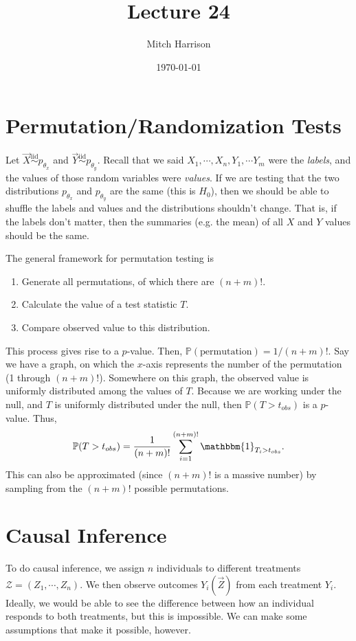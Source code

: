 \documentclass[titlepage, 12pt, leqno]{article}
\title{\Huge{Lecture 24}}
\author{\large{Mitch Harrison}}
\date{\today}
\begin{document}
\setlength{\parskip}{1\baselineskip}
\setlength{\parindent}{15pt}
\maketitle
\tableofcontents
\newpage


\section{Permutation/Randomization Tests}

Let $\vec X \overset{\mathrm{iid}}{\sim}p_{\theta_{x}}$ and
$\vec Y \overset{\mathrm{iid}}{\sim} p_{\theta_{y}}$. Recall that we said
$X_{1}, \cdots , X_{n}, Y_{1}, \cdots Y_{m}$ were the \textit{labels}, and the
values of those random variables were \textit{values}. If we are testing that
the two distributions $p_{\theta_{x}}$ and $p_{\theta_{y}}$ are the same (this
is $H_{0}$), then we should be able to shuffle the labels and values and
the distributions shouldn't change. That is, if the labels don't matter, then
the summaries (e.g. the mean) of all $X$ and $Y$ values should be the same.

The general framework for permutation testing is
\begin{enumerate}
    \item Generate all permutations, of which there are $(n+m)!$.
    \item Calculate the value of a test statistic $T$.
    \item Compare observed value to this distribution.
\end{enumerate}

This process gives rise to a $p$-value. Then, $\mathbb{P}( \text{permutation})
= 1/(n+m)!$. Say we have a graph, on which the $x$-axis represents the
number of the permutation (1 through $(n+m)!$). Somewhere on this graph, the
observed value is uniformly distributed among the values of $T$. Because we 
are working under the null, and $T$ is uniformly distributed under the null, 
then $\mathbb{P}(T>t_{obs})$ is a $p$-value. Thus,
\[
\mathbb{P}(T>t_{obs}) = \frac{1}{(n+m)!}\sum_{i=1}^{(n+m)!}\mathbbm{1}_{
T_{i} > t_{obs}}.
\]
This can also be approximated (since $(n+m)!$ is a massive number) by sampling
from the $(n+m)!$ possible permutations.

\pagebreak
\section{Causal Inference}
To do causal inference, we assign $n$ individuals to different treatments
$\mathcal{Z} = (Z_{1}, \cdots ,Z_{n})$. We then observe outcomes
$Y_{i}(\vec Z)$ from each treatment $Y_{i}$. Ideally, we would be able to
see the difference between how an individual responds to both treatments, but
this is impossible. We can make some assumptions that make it possible, however.
\end{document}
